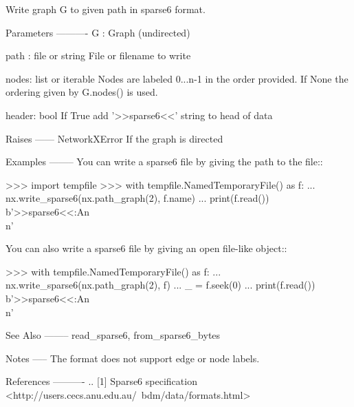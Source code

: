 \begin{DoxyVerb}Write graph G to given path in sparse6 format.

Parameters
----------
G : Graph (undirected)

path : file or string
   File or filename to write

nodes: list or iterable
   Nodes are labeled 0...n-1 in the order provided.  If None the ordering
   given by G.nodes() is used.

header: bool
   If True add '>>sparse6<<' string to head of data

Raises
------
NetworkXError
    If the graph is directed

Examples
--------
You can write a sparse6 file by giving the path to the file::

    >>> import tempfile
    >>> with tempfile.NamedTemporaryFile() as f:
    ...     nx.write_sparse6(nx.path_graph(2), f.name)
    ...     print(f.read())
    b'>>sparse6<<:An\\n'

You can also write a sparse6 file by giving an open file-like object::

    >>> with tempfile.NamedTemporaryFile() as f:
    ...     nx.write_sparse6(nx.path_graph(2), f)
    ...     _ = f.seek(0)
    ...     print(f.read())
    b'>>sparse6<<:An\\n'

See Also
--------
read_sparse6, from_sparse6_bytes

Notes
-----
The format does not support edge or node labels.

References
----------
.. [1] Sparse6 specification
       <http://users.cecs.anu.edu.au/~bdm/data/formats.html>\end{DoxyVerb}
 